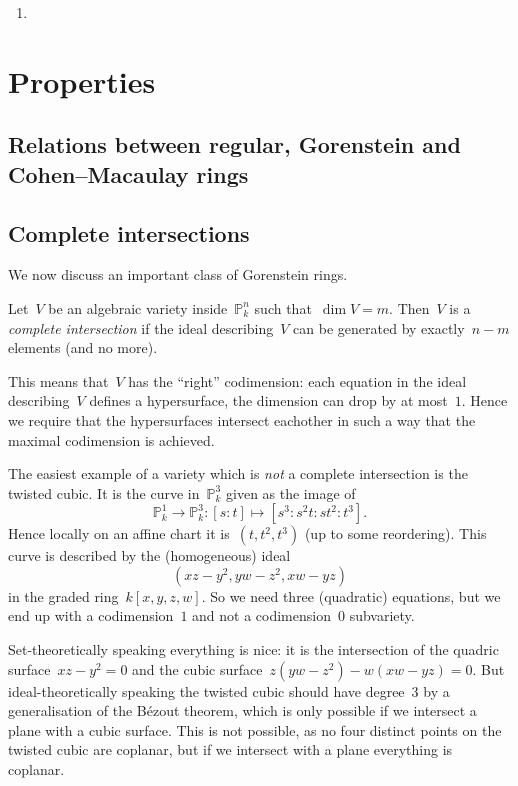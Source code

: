 \documentclass[10pt,a4paper]{article}
\begin{document}
\begin{enumerate}
  \item 
\end{enumerate}


\section{Properties}
\label{section:properties}
\subsection{Relations between regular, Gorenstein and Cohen--Macaulay rings}
\label{subsection:relations}

\subsection{Complete intersections}
\label{subsection:complete-intersections}
We now discuss an important class of Gorenstein rings.
\begin{definition}
  Let~$V$ be an algebraic variety inside~$\mathbb{P}_k^n$ such that~$\dim V=m$. Then~$V$ is a \emph{complete intersection} if the ideal describing~$V$ can be generated by exactly~$n-m$ elements (and no more).
\end{definition}
This means that~$V$ has the ``right'' codimension: each equation in the ideal describing~$V$ defines a hypersurface, the dimension can drop by at most~$1$. Hence we require that the hypersurfaces intersect eachother in such a way that the maximal codimension is achieved.
\begin{example}
\end{example}
\begin{example}
  The easiest example of a variety which is \emph{not} a complete intersection is the twisted cubic. It is the curve in~$\mathbb{P}_k^3$ given as the image of
  \begin{equation}
    \mathbb{P}_k^1\to\mathbb{P}_k^3:[s:t]\mapsto[s^3:s^2t:st^2:t^3].
  \end{equation}
  Hence locally on an affine chart it is~$(t,t^2,t^3)$ (up to some reordering). This curve is described by the (homogeneous) ideal
  \begin{equation}
    (xz-y^2,yw-z^2,xw-yz)
  \end{equation}
  in the graded ring~$k[x,y,z,w]$. So we need three (quadratic) equations, but we end up with a codimension~$1$ and not a codimension~$0$ subvariety.

  Set-theoretically speaking everything is nice: it is the intersection of the quadric surface~$xz-y^2=0$ and the cubic surface~$z(yw-z^2)-w(xw-yz)=0$. But ideal-theoretically speaking the twisted cubic should have degree~$3$ by a generalisation of the B\'ezout theorem, which is only possible if we intersect a plane with a cubic surface. This is not possible, as no four distinct points on the twisted cubic are coplanar, but if we intersect with a plane everything is coplanar.
\end{example}
\end{document}
